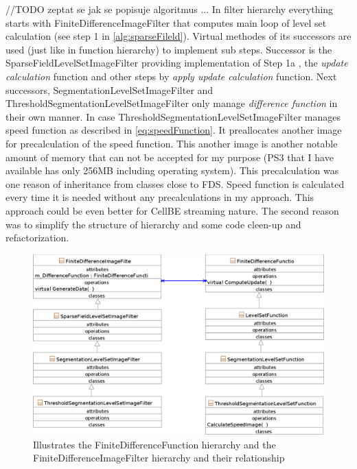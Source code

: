 //TODO zeptat se jak se popisuje algoritmus ...
In filter hierarchy everything starts with FiniteDifferenceImageFilter that computes main loop of level set calculation (see step 1 in \ref{alg:sparseFileld}). Virtual methodes of its successors are used (just like in function hierarchy) to implement sub steps. Successor is the SparseFieldLevelSetImageFilter providing implementation of Step 1a , the \emph{update calculation} function and other steps by \emph{apply update calculation} function. Next successors, SegmentationLevelSetImageFilter and ThresholdSegmentationLevelSetImageFilter only manage \emph{difference function} in their own manner. In case ThresholdSegmentationLevelSetImageFilter manages speed function as described in \ref{eq:speedFunction}. It preallocates another image for precalculation of the speed function. This another image is another notable amount of memory that can not be accepted for my purpose (PS3 that I have available has only 256MB including operating system). This precalculation was one reason of inheritance from classes close to FDS. Speed function is calculated every time it is needed without any precalculations in my approach. This approach could be even better for CellBE streaming nature. The second reason was to simplify the structure of hierarchy and some code cleen-up and refactorization.

\begin{figure}
    \centering
    \includegraphics[width=15cm]{data/originalHierarchy.eps}
    \caption[Original ITK thresholding level set filter class hierarchy]{Illustrates the FiniteDifferenceFunction hierarchy and the FiniteDifferenceImageFilter hierarchy and their relationship}
    \label{fg:originalHierarchy}
\end{figure}

